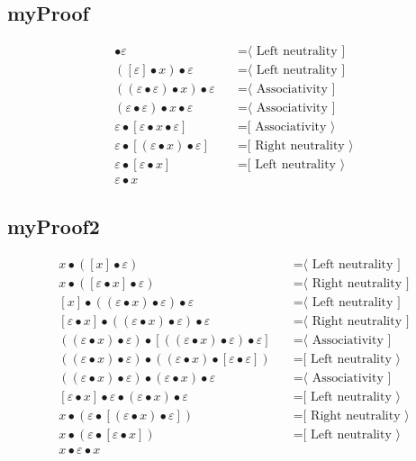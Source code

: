 \documentclass{article}
\begin{document}
\subsection{myProof}
\begin{align*}
[x] • ε
  & \quad \text{=⟨ Left neutrality ]}\\
([ε] • x) • ε
  & \quad \text{=⟨ Left neutrality ]}\\
((ε • ε) • x) • ε
  & \quad \text{=⟨ Associativity ]}\\
(ε • ε) • x • ε
  & \quad \text{=⟨ Associativity ]}\\
ε • [ε • x • ε]
  & \quad \text{=[ Associativity ⟩}\\
ε • [(ε • x) • ε]
  & \quad \text{=[ Right neutrality ⟩}\\
ε • [ε • x]
  & \quad \text{=[ Left neutrality ⟩}\\
ε • x
\end{align*}
\subsection{myProof2}
\begin{align*}
x • ([x] • ε)
  & \quad \text{=⟨ Left neutrality ]}\\
x • ([ε • x] • ε)
  & \quad \text{=⟨ Right neutrality ]}\\
[x] • ((ε • x) • ε) • ε
  & \quad \text{=⟨ Left neutrality ]}\\
[ε • x] • ((ε • x) • ε) • ε
  & \quad \text{=⟨ Right neutrality ]}\\
((ε • x) • ε) • [((ε • x) • ε) • ε]
  & \quad \text{=⟨ Associativity ]}\\
((ε • x) • ε) • ((ε • x) • [ε • ε])
  & \quad \text{=[ Left neutrality ⟩}\\
((ε • x) • ε) • (ε • x) • ε
  & \quad \text{=⟨ Associativity ]}\\
[ε • x] • ε • (ε • x) • ε
  & \quad \text{=[ Left neutrality ⟩}\\
x • (ε • [(ε • x) • ε])
  & \quad \text{=[ Right neutrality ⟩}\\
x • (ε • [ε • x])
  & \quad \text{=[ Left neutrality ⟩}\\
x • ε • x
\end{align*}
\end{document}
